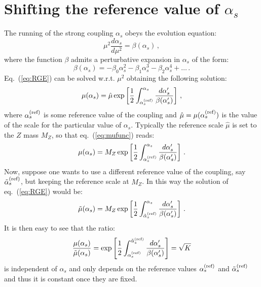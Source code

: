 \documentclass[10pt,a4paper]{article}
\begin{document}
\section*{Shifting the reference value of $\alpha_s$}

The running of the strong coupling $\alpha_s$ obeys the evolution
equation:
\begin{equation}\label{eq:RGE}
\mu^2\frac{d\alpha_s}{d\mu^2} = \beta(\alpha_s)\,,
\end{equation}
where the function $\beta$ admits a perturbative expansion in
$\alpha_s$ of the form:
\begin{equation}
\beta(\alpha_s) = -\beta_0 \alpha_s^2 -\beta_1 \alpha_s^3 -\beta_2
\alpha_s^4 + \dots\,.
\end{equation}
Eq.~(\ref{eq:RGE}) can be solved w.r.t. $\mu^2$ obtaining the
following solution:
\begin{equation}\label{eq:mufunc}
\mu(\alpha_s) = \hat{\mu}  \exp\left[\frac12\int_{\alpha_s^{(\rm ref)}}^{\alpha_s}\frac{d\alpha_s'}{\beta(\alpha_s')}\right]\,,
\end{equation}
where $\alpha_s^{(\rm ref)}$ is some reference value of the coupling
and $\hat{\mu} = \mu(\alpha_s^{(\rm ref)})$ is the value of the
scale for the particular value of $\alpha_s$. Typically the reference
scale $\hat{\mu}$ is set to the $Z$ mass $M_Z$, so that
eq.~(\ref{eq:mufunc}) reads:
\begin{equation}
\mu(\alpha_s) = M_Z  \exp\left[\frac12\int_{\alpha_s^{(\rm ref)}}^{\alpha_s}\frac{d\alpha_s'}{\beta(\alpha_s')}\right]\,.
\end{equation}
Now, suppose one wants to use a different reference value of the
coupling, say $\tilde\alpha_s^{(\rm ref)}$, but keeping the reference
scale at $M_Z$. In this way the solution of eq.~(\ref{eq:RGE}) would
be:
\begin{equation}\label{eq:mufunc2}
\tilde\mu(\alpha_s) = M_Z \exp\left[\frac12\int_{\tilde\alpha_s^{(\rm ref)}}^{\alpha_s}\frac{d\alpha_s'}{\beta(\alpha_s')}\right]\,.
\end{equation}
It is then easy to see that the ratio:
\begin{equation}\label{eq:mufuncratio}
\frac{\mu(\alpha_s)}{\tilde\mu(\alpha_s)} =
\exp\left[\frac12\int^{\tilde\alpha_s^{(\rm
      ref)}}_{\alpha_s^{(\rm ref)}}\frac{d\alpha_s'}{\beta(\alpha_s')}\right] = \sqrt{K}
\end{equation}
is independent of $\alpha_s$ and only depends on the reference values
$\alpha_s^{(\rm ref)}$ and $\tilde\alpha_s^{(\rm ref)}$ and thus it is
constant once they are fixed.
\end{document}
